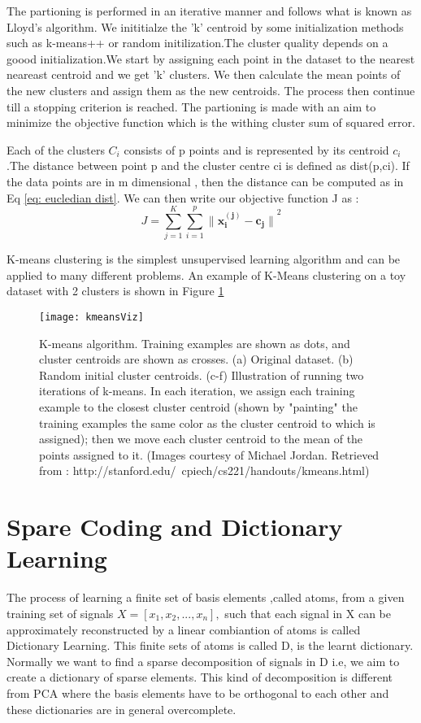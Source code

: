 The partioning is performed in an iterative manner and follows what is known as Lloyd's algorithm\cite{lloydsalgo}. We inititialze the 'k' centroid by some initialization methods such as k-means++ or random initilization.The cluster quality depends on a goood initialization.We start by assigning each point in the dataset to the nearest neareast centroid and we get 'k' clusters. We then calculate the mean points of the new clusters and assign them as the new centroids. The process then continue till a stopping criterion is reached. The partioning is made with an aim to minimize the objective function which is the withing cluster sum of squared error.

Each of the clusters $C_i$ consists of p points and is represented by its centroid $c_i$.The distance between point p and the cluster centre ci is defined as dist(p,ci). If the data points are in m dimensional , then the distance can be computed as in Eq \ref{eq: eucledian dist}. We can then write our objective function J as :
\begin{equation}
J = \sum\limits_{j=1}^{K} \sum\limits_{i=1}^{p} {\lVert\mathbf{x^{(j)}_i - c_j}  \rVert}^2
\end{equation}

K-means clustering is the simplest unsupervised learning algorithm and can be applied to many different problems. An example of K-Means clustering on a toy dataset with 2 clusters is shown in Figure \ref{fig:kmeansvisz}
\begin{figure}
	\centering
	\texttt{[image: kmeansViz]}
	\caption[K-Means Visualization]{ K-means algorithm. Training examples are shown as dots, and cluster centroids are shown as crosses. (a) Original dataset. (b) Random initial cluster centroids. (c-f) Illustration of running two iterations of k-means. In each iteration, we assign each training example to the closest cluster centroid (shown by "painting" the training examples the same color as the cluster centroid to which is assigned); then we move each cluster centroid to the mean of the points assigned to it. (Images courtesy of Michael Jordan. Retrieved from : http://stanford.edu/~cpiech/cs221/handouts/kmeans.html)}
	\label{fig:kmeansvisz}
\end{figure}

\section{Spare Coding and Dictionary Learning}\label{sec:dlsparse}
The process of learning a finite set of basis elements ,called atoms, from a given training set of signals $X=[x_1,x_2,...,x_n], $ such that each signal in X can be approximately reconstructed by a linear combiantion of atoms is called Dictionary Learning. This finite sets of atoms is called D, is the learnt dictionary. Normally we want to find a sparse decomposition of signals in D i.e, we aim to create a dictionary of sparse elements. This kind of decomposition is different from PCA where the basis elements have to be orthogonal to each other and these dictionaries are in general overcomplete.\\

